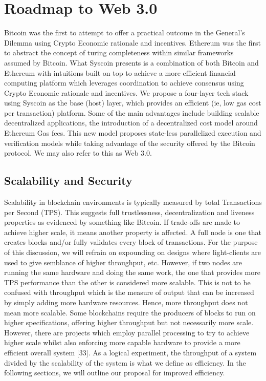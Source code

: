 \documentclass[peerreview]{ieeesyscoin}
\begin{document}
\section{Roadmap to Web 3.0}
\label{section:roadmap}

Bitcoin was the first to attempt to offer a practical outcome in the General's Dilemma using Crypto Economic rationale and incentives. Ethereum was the first to abstract the concept of turing completeness within similar frameworks assumed by Bitcoin. What Syscoin presents is a combination of both Bitcoin and Ethereum with intuitions built on top to achieve a more efficient financial computing platform which leverages coordination to achieve consensus using Crypto Economic rationale and incentives. We propose a four-layer tech stack using Syscoin as the base (host) layer, which provides an efficient (ie, low gas cost per transaction) platform. Some of the main advantages include building scalable decentralized applications, the introduction of a decentralized cost model around Ethereum Gas fees. This new model proposes state-less parallelized execution and verification models while taking advantage of the security offered by the Bitcoin protocol. We may also refer to this as Web 3.0.

\subsection{Scalability and Security}

Scalability in blockchain environments is typically measured by total Transactions per Second (TPS). This suggests full trustlessness, decentralization and liveness properties as evidenced by something like Bitcoin. If trade-offs are made to achieve higher scale, it means another property is affected. A full node is one that creates blocks and/or fully validates every block of transactions. For the purpose of this discussion, we will refrain on expounding on designs where light-clients are used to give semblance of higher throughput, etc. However, if two nodes are running the same hardware and doing the same work, the one that provides more TPS performance than the other is considered more scalable. This is not to be confused with throughput which is the measure of output that can be increased by simply adding more hardware resources. Hence, more throughput does not mean more scalable. Some blockchains require the producers of blocks to run on higher specifications, offering higher throughput but not necessarily more scale. However, there are projects which employ parallel processing to try to achieve higher scale whilst also enforcing more capable hardware to provide a more efficient overall system [33]. As a logical experiment, the throughput of a system divided by the scalability of the system is what we define as efficiency. In the following sections, we will outline our proposal for improved efficiency.
\end{document}
